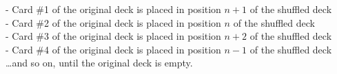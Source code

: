 \begin{itemize}
\begin{enumerate}
\noindent
- Card \#1 of the original deck is placed in position $n+1$ of the shuffled deck \\
- Card \#2 of the original deck is placed in position $n$ of the shuffled deck \\
- Card \#3 of the original deck is placed in position $n+2$ of the shuffled deck \\
- Card \#4 of the original deck is placed in position $n-1$ of the shuffled deck \\
\hspace*{.1in} \ldots and so on, until the original deck is empty.

\smallskip
{}
\end{enumerate}
\end{itemize}
